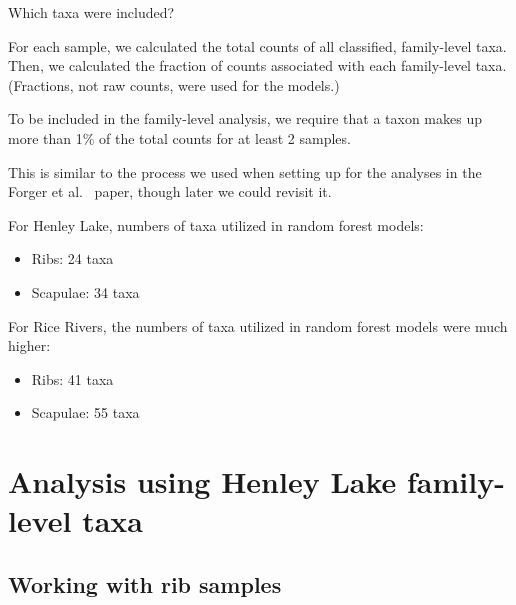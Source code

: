 \documentclass{beamer}
\begin{document}
\begin{frame}{Which taxa were included?}

  {\footnotesize
  \noindent For each sample, we calculated the total counts of all
  classified, family-level taxa.  Then, we calculated the fraction of
  counts associated with each family-level taxa.  (Fractions, not raw
  counts, were used for the models.)

  \vspace{0.1in}

  \noindent To be included in the family-level analysis, we require that a taxon
  makes up more than 1\% of the total counts for at least 2 samples.

  \vspace{0.1in}

  \noindent This is similar to the process we used when setting up for
  the analyses in the Forger et al.~ paper, though later we could
  revisit it.

  \vspace{0.1in}

  \noindent For Henley Lake, numbers of taxa utilized in random forest models:
  \begin{itemize}
    \item Ribs: 24 taxa
    \item Scapulae: 34 taxa
  \end{itemize}

  \vspace{0.1in}
  
  \noindent For Rice Rivers, the numbers of taxa utilized in random forest models were much higher:
  \begin{itemize}
    \item Ribs: 41 taxa
    \item Scapulae: 55 taxa
  \end{itemize}
}

\end{frame}




\section[Henley Lake]{Analysis using Henley Lake family-level taxa}


\subsection[Ribs]{Working with rib samples}
\end{document}
